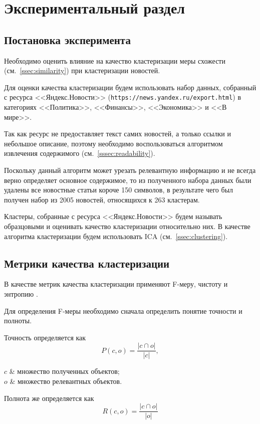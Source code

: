 \chapter{Экспериментальный раздел}
\section{Постановка эксперимента}
Необходимо оценить влияние на качество кластеризации меры схожести (см.~\ref{ssec:similarity}) при кластеризации новостей.

Для оценки качества кластеризации будем использовать набор данных, собранный с ресурса <<Яндекс.Новости>> (\verb|https://news.yandex.ru/export.html|) в категориях <<Политика>>, <<Финансы>>, <<Экономика>> и <<В мире>>.

Так как ресурс не предоставляет текст самих новостей, а только ссылки и небольшое описание, поэтому необходимо воспользоваться алгоритмом извлечения содержимого (см.~\ref{sssec:readability}).

Поскольку данный алгоритм может урезать релевантную информацию и не всегда верно определяет основное содержимое, то из полученного набора данных были удалены все новостные статьи короче 150 символов, в результате чего был получен набор из 2005 новостей, относящихся к 263 кластерам.

Кластеры, собранные с ресурса <<Яндекс.Новости>> будем называть образцовыми и оценивать качество кластеризации относительно них. В качестве алгоритма кластеризации будем использовать ICA (см.~\ref{ssec:clustering}).

\section{Метрики качества кластеризации}
В качестве метрик качества кластеризации применяют F-меру, чистоту и энтропию \cite{andrews07}.

Для определения F-меры необходимо сначала определить понятие точности и полноты.

Точность определяется как
\begin{equation}
    P(c,o)=\frac{|c\cap o|}{|c|},
\end{equation}
\begin{conditions}
    $c$ & множество полученных объектов; \\
    $o$ & множество релевантных объектов. \\
\end{conditions}

Полнота же определяется как
\begin{equation}
    R(c,o)=\frac{|c\cap o|}{|o|}
\end{equation}

